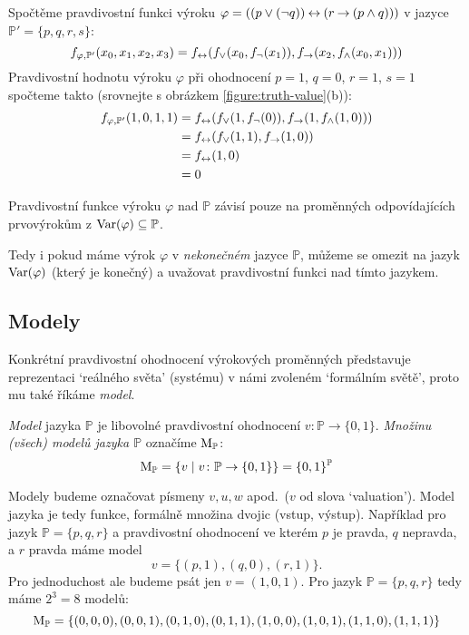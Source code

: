 \begin{example}
    Spočtěme pravdivostní funkci výroku $\varphi = ((p\lor (\neg q)) \mathbin{\leftrightarrow} (r\mathbin{\rightarrow} (p \land q)))$ v jazyce~$\mathbb P'=\{p,q,r,s\}$:
    $$
    f_{\varphi,\mathbb P'}(x_0,x_1,x_2,x_3)=f_{\mathbin{\leftrightarrow}}(f_{\lor}(x_0,f_\neg(x_1)),f_{\mathbin{\rightarrow}}(x_2,f_{\land}(x_0,x_1)))
    $$
    Pravdivostní hodnotu výroku $\varphi$ při ohodnocení $p=1$, $q=0$, $r=1$, $s=1$ spočteme takto (srovnejte s obrázkem \ref{figure:truth-value}(b)):
    \begin{align*}
    f_{\varphi,\mathbb P'}(1,0,1,1)
        &=f_{\mathbin{\leftrightarrow}}(f_{\lor}(1,f_\neg(0)),f_{\mathbin{\rightarrow}}(1,f_{\land}(1,0))) \\
        &=f_{\mathbin{\leftrightarrow}}(f_{\lor}(1,1),f_{\mathbin{\rightarrow}}(1,0))\\
        &=f_{\mathbin{\leftrightarrow}}(1,0)\\
        &=0
    \end{align*}
\end{example}

\begin{observation}
Pravdivostní funkce výroku $\varphi$ nad $\mathbb P$ závisí pouze na proměnných odpovídajících prvovýrokům z $\operatorname{Var}(\varphi)\subseteq\mathbb P$.
\end{observation}

Tedy i pokud máme výrok $\varphi$ v \emph{nekonečném} jazyce $\mathbb P$, můžeme se omezit na jazyk $\operatorname{Var}(\varphi)$ (který je konečný) a uvažovat pravdivostní funkci nad tímto jazykem.


\subsection{Modely}

Konkrétní pravdivostní ohodnocení výrokových proměnných představuje reprezentaci `reálného světa' (systému) v námi zvoleném `formálním světě', proto mu také říkáme \emph{model}.

\begin{definition}\label{definition:model}
    \emph{Model} jazyka $\mathbb P$ je libovolné pravdivostní ohodnocení $v\colon \mathbb P\to \{0,1\}$. \emph{Množinu (všech) modelů jazyka $\mathbb P$} označíme  $\operatorname{M}_\mathbb P$:
    $$
    \operatorname{M}_\mathbb P=\left\{v\mid v\colon \mathbb P\to \{0,1\}\right\}=\{0,1\}^\mathbb P
    $$
\end{definition}
Modely budeme označovat písmeny $v,u,w$ apod.\ ($v$ od slova `valuation'). Model jazyka je tedy funkce, formálně množina dvojic (vstup, výstup). Například pro jazyk $\mathbb P=\{p,q,r\}$ a pravdivostní ohodnocení ve kterém $p$ je pravda, $q$ nepravda, a $r$ pravda máme model
$$
v=\{(p,1),(q,0),(r,1)\}.
$$
Pro jednoduchost ale budeme psát jen $v=(1,0,1)$. Pro jazyk $\mathbb P=\{p,q,r\}$ tedy máme $2^3=8$ modelů:
$$
\operatorname{M}_\mathbb P=\{(0,0,0),(0,0,1),(0,1,0),(0,1,1),(1,0,0),(1,0,1),(1,1,0),(1,1,1)\}
$$

